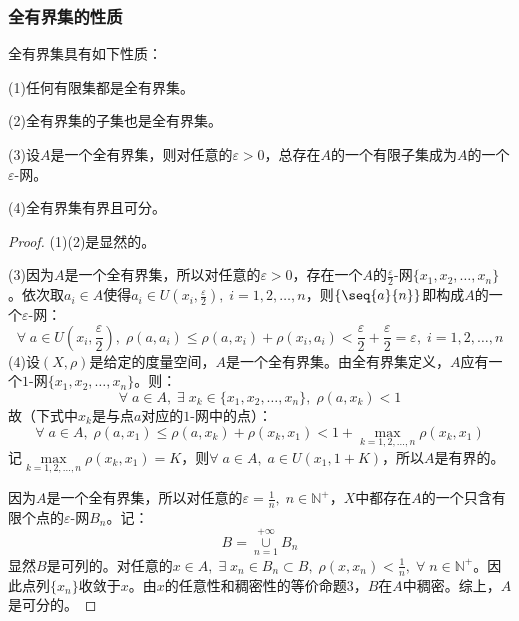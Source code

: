\subsubsection{全有界集的性质}
\begin{property}
	全有界集具有如下性质：\par
	(1)任何有限集都是全有界集。\par
	(2)全有界集的子集也是全有界集。\par
	(3)设$A$是一个全有界集，则对任意的$\varepsilon>0$，总存在$A$的一个有限子集成为$A$的一个$\varepsilon$-网。\par
	(4)全有界集有界且可分。
\end{property}
\begin{proof}
	(1)(2)是显然的。\par
	(3)因为$A$是一个全有界集，所以对任意的$\varepsilon>0$，存在一个$A$的$\frac{\varepsilon}{2}$-网$\{x_1,x_2,\dots,x_n\}$。依次取$a_i\in A$使得$a_i\in U(x_i,\frac{\varepsilon}{2}),\;i=1,2,\dots,n$，则$\{\seq{a}{n}\}$即构成$A$的一个$\varepsilon$-网：
	\begin{equation*}
		\forall\;a\in U\left(x_i,\frac{\varepsilon}{2}\right),\;\rho(a,a_i)\leqslant\rho(a,x_i)+\rho(x_i,a_i)<\frac{\varepsilon}{2}+\frac{\varepsilon}{2}=\varepsilon,\;i=1,2,\dots,n
	\end{equation*}
	\hspace{2em}(4)设$(X,\rho)$是给定的度量空间，$A$是一个全有界集。由全有界集定义，$A$应有一个$1$-网$\{x_1,x_2,\dots,x_n\}$。则：
	\begin{equation*}
		\forall\;a\in A,\;\exists\;x_{k}\in\{x_1,x_2,\dots,x_n\},\;\rho(a,x_k)<1
	\end{equation*}
	故（下式中$x_k$是与点$a$对应的$1$-网中的点）：
	\begin{equation*}
		\forall\;a\in A,\;\rho(a,x_1)\leqslant\rho(a,x_k)+\rho(x_k,x_1)<1+\max_{k=1,2,\dots,n}\rho(x_k,x_1)
	\end{equation*}
	记$\max\limits_{k=1,2,\dots,n}\rho(x_k,x_1)=K$，则$\forall\;a\in A,\;a\in U(x_1,1+K)$，所以$A$是有界的。\par
	因为$A$是一个全有界集，所以对任意的$\varepsilon=\frac{1}{n},\;n\in\mathbb{N}^+$，$X$中都存在$A$的一个只含有限个点的$\varepsilon$-网$B_n$。记：
	\begin{equation*}
		B=\underset{n=1}{\overset{+\infty}{\cup}}B_n
	\end{equation*}
	显然$B$是可列的。对任意的$x\in A,\;\exists\;x_n\in B_n\subset B,\;\rho(x,x_n)<\frac{1}{n},\;\forall\;n\in\mathbb{N}^+$。因此点列$\{x_n\}$收敛于$x$。由$x$的任意性和稠密性的等价命题$3$，$B$在$A$中稠密。综上，$A$是可分的。
\end{proof}
